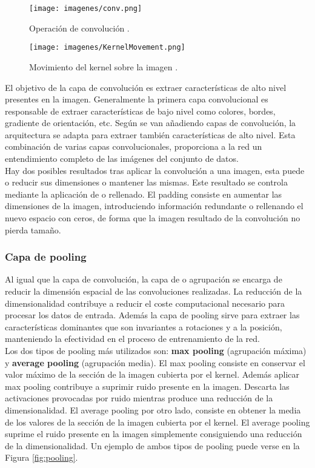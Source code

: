 \begin{figure}[ht!]
    \centering
    \texttt{[image: imagenes/conv.png]}
    \caption[Operación de convolución.]{Operación de convolución \cite{saha_2018}.}
    \label{fig:conv}
\end{figure}

\begin{figure}[ht!]
    \centering
    \texttt{[image: imagenes/KernelMovement.png]}
    \caption[Movimiento del kernel sobre la imagen.]{Movimiento del kernel sobre la imagen \cite{saha_2018}.}
    \label{fig:kernelmov}
\end{figure}

El objetivo de la capa de convolución es extraer características de alto nivel presentes en la imagen. Generalmente la primera capa convolucional es responsable de extraer características de bajo nivel \cite{saha_2018} como colores, bordes, gradiente de orientación, etc. Según se van añadiendo capas de convolución, la arquitectura se adapta para extraer también características de alto nivel. Esta combinación de varias capas convolucionales, proporciona a la red un entendimiento completo de las imágenes del conjunto de datos.\\

Hay dos posibles resultados tras aplicar la convolución a una imagen, esta puede o reducir sus dimensiones o mantener las mismas. Este resultado se controla mediante la aplicación de  o rellenado. El padding consiste en aumentar las dimensiones de la imagen, introduciendo información redundante o rellenando el nuevo espacio con ceros, de forma que la imagen resultado de la convolución no pierda tamaño.

\subsubsection{Capa de pooling}

Al igual que la capa de convolución, la capa de  o agrupación se encarga de reducir la dimensión espacial de las convoluciones realizadas. La reducción de la dimensionalidad contribuye a reducir el coste computacional necesario para procesar los datos de entrada. Además la capa de pooling sirve para extraer las características dominantes que son invariantes a rotaciones y a la posición, manteniendo la efectividad en el proceso de entrenamiento de la red.\\

Los dos tipos de pooling más utilizados son: \textbf{max pooling} (agrupación máxima) y \textbf{average pooling} (agrupación media). El max pooling consiste en conservar el valor máximo de la sección de la imagen cubierta por el kernel. Además aplicar max pooling contribuye a suprimir ruido presente en la imagen. Descarta las activaciones provocadas por ruido mientras produce una reducción de la dimensionalidad. El average pooling por otro lado, consiste en obtener la media de los valores de la sección de la imagen cubierta por el kernel. El average pooling suprime el ruido presente en la imagen simplemente consiguiendo una reducción de la dimensionalidad. Un ejemplo de ambos tipos de pooling puede verse en la Figura \ref{fig:pooling}.


